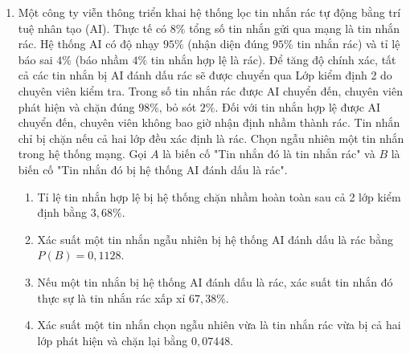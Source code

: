 \documentclass[12pt,a4paper]{article}
\begin{document}
\begin{enumerate}[label=\textbf{Câu \arabic*:}, leftmargin=*]
\item
\begin{minipage}[t]{\linewidth} 
Một công ty viễn thông triển khai hệ thống lọc tin nhắn rác tự động bằng trí tuệ nhân tạo (AI). Thực tế có $8\%$ tổng số tin nhắn gửi qua mạng là tin nhắn rác. Hệ thống AI có độ nhạy $95\%$ (nhận diện đúng $95\%$ tin nhắn rác) và tỉ lệ báo sai $4\%$ (báo nhầm $4\%$ tin nhắn hợp lệ là rác). Để tăng độ chính xác, tất cả các tin nhắn bị AI đánh dấu rác sẽ được chuyển qua Lớp kiểm định 2 do chuyên viên kiểm tra. Trong số tin nhắn rác được AI chuyển đến, chuyên viên phát hiện và chặn đúng $98\%$, bỏ sót $2\%$. Đối với tin nhắn hợp lệ được AI chuyển đến, chuyên viên không bao giờ nhận định nhầm thành rác. Tin nhắn chỉ bị chặn nếu cả hai lớp đều xác định là rác.
Chọn ngẫu nhiên một tin nhắn trong hệ thống mạng. Gọi $A$ là biến cố "Tin nhắn đó là tin nhắn rác" và $B$ là biến cố "Tin nhắn đó bị hệ thống AI đánh dấu là rác".
\begin{enumerate}[label=\alph*)]
\item Tỉ lệ tin nhắn hợp lệ bị hệ thống chặn nhầm hoàn toàn sau cả 2 lớp kiểm định bằng $3{,}68\%$.
\item Xác suất một tin nhắn ngẫu nhiên bị hệ thống AI đánh dấu là rác bằng $P(B) = 0{,}1128$.
\item Nếu một tin nhắn bị hệ thống AI đánh dấu là rác, xác suất tin nhắn đó thực sự là tin nhắn rác xấp xỉ $67{,}38\%$.
\item Xác suất một tin nhắn chọn ngẫu nhiên vừa là tin nhắn rác vừa bị cả hai lớp phát hiện và chặn lại bằng $0{,}07448$.
\end{enumerate}
\end{minipage}


\end{enumerate}
\end{document}
